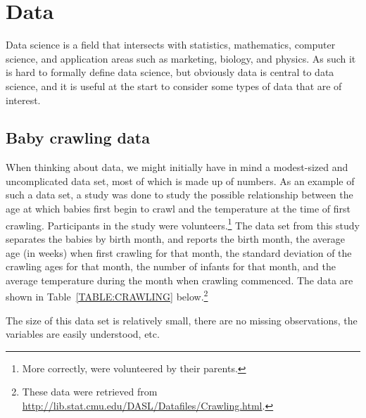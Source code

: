 \chapter{Data}
Data science is a field that intersects with statistics, mathematics, computer science, and application areas such as marketing, biology, and physics. As such it is hard to formally define data science, but obviously data is central to data science, and it is useful at the start to consider some types of data that are of interest.

\section{Baby crawling data}
When thinking about data, we might initially have in mind a modest-sized and uncomplicated data set, most of which is made up of numbers. As an example of such a data set, a study was done to study the possible relationship between the age at which babies first begin to crawl and the temperature at the time of first crawling. Participants in the study were volunteers.\footnote{More correctly, were volunteered by their parents.} The data set from this study separates the babies by birth month, and reports the birth month, the average age (in weeks) when first crawling for that month, the standard deviation of the crawling ages for that month, the number of infants for that month, and the average temperature during the month when crawling commenced. The data are shown in Table~\ref{TABLE:CRAWLING} below.\footnote{These data were retrieved from \url{http://lib.stat.cmu.edu/DASL/Datafiles/Crawling.html}.}
\begin{knitrout}
\color{fgcolor}\begin{kframe}


{\ttfamily\noindent{}}

{\ttfamily\noindent\bfseries{}}\end{kframe}
\end{knitrout}

\begin{kframe}


{\ttfamily\noindent\bfseries{}}\end{kframe}
The size of this data set is relatively small, there are no missing observations, the variables are easily understood, etc. 


